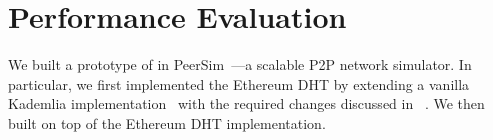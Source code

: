 
\section{Performance Evaluation}
\label{sec:eval}



We built a prototype of \sysname in PeerSim~\cite{p2p09-peersim}---a scalable P2P network simulator.  In particular, we first implemented the Ethereum DHT by extending a vanilla Kademlia implementation~\cite{peersim_kademlia} with the required changes discussed in ~. We then built \sysname on top of the Ethereum DHT implementation.

